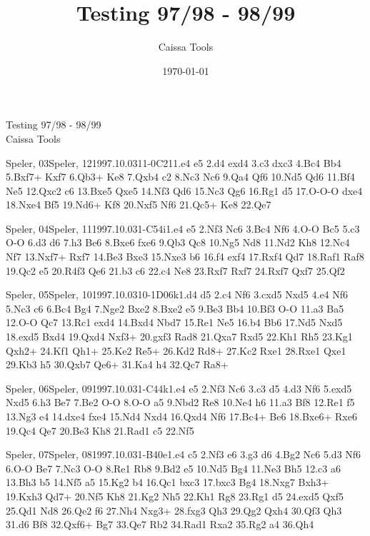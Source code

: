 \documentclass[twocolumn,a4paper,10pt]{report}
\title{Testing 97/98 - 98/99}
\author{Caissa Tools}
\date{\today{}}
\begin{document}
\begin{titlepage}
  \begin{center}
    \huge Testing 97/98 - 98/99 \\
    \vspace{1in}
    \large Caissa Tools \\
  \end{center}
\end{titlepage}

\begin{chessgame}{Speler, 03}{Speler, 12}{1997.10.03}{1}{1-0}{C21}{1.e4 e5 2.d4 exd4 3.c3 dxc3 4.Bc4 Bb4 5.Bxf7+ Kxf7 6.Qb3+ Ke8 7.Qxb4 c2 8.Nc3 Nc6 9.Qa4 Qf6 10.Nd5 Qd6 11.Bf4 Ne5 12.Qxc2 c6 13.Bxe5 Qxe5 14.Nf3 Qd6 15.Nc3 Qg6 16.Rg1 d5 17.O-O-O dxe4 18.Nxe4 Bf5 19.Nd6+ Kf8 20.Nxf5 Nf6 21.Qc5+ Ke8 22.Qe7\mate}\end{chessgame}
\begin{chessgame}{Speler, 04}{Speler, 11}{1997.10.03}{1}{\textonehalf-\textonehalf}{C54i}{1.e4 e5 2.Nf3 Nc6 3.Bc4 Nf6 4.O-O Bc5 5.c3 O-O 6.d3 d6 7.h3 Be6 8.Bxe6 fxe6 9.Qb3 Qc8 10.Ng5 Nd8 11.Nd2 Kh8 12.Nc4 Nf7 13.Nxf7+ Rxf7 14.Be3 Bxe3 15.Nxe3 b6 16.f4 exf4 17.Rxf4 Qd7 18.Raf1 Raf8 19.Qc2 e5 20.R4f3 Qe6 21.b3 c6 22.c4 Ne8 23.Rxf7 Rxf7 24.Rxf7 Qxf7 25.Qf2}\end{chessgame}
\begin{chessgame}{Speler, 05}{Speler, 10}{1997.10.03}{1}{0-1}{D06k}{1.d4 d5 2.c4 Nf6 3.cxd5 Nxd5 4.e4 Nf6 5.Nc3 c6 6.Bc4 Bg4 7.Nge2 Bxe2 8.Bxe2 e5 9.Be3 Bb4 10.Bf3 O-O 11.a3 Ba5 12.O-O Qc7 13.Rc1 exd4 14.Bxd4 Nbd7 15.Re1 Ne5 16.b4 Bb6 17.Nd5 Nxd5 18.exd5 Bxd4 19.Qxd4 Nxf3+ 20.gxf3 Rad8 21.Qxa7 Rxd5 22.Kh1 Rh5 23.Kg1 Qxh2+ 24.Kf1 Qh1+ 25.Ke2 Re5+ 26.Kd2 Rd8+ 27.Kc2 Rxe1 28.Rxe1 Qxe1 29.Kb3 h5 30.Qxb7 Qe6+ 31.Ka4 h4 32.Qc7 Ra8+}\end{chessgame}
\begin{chessgame}{Speler, 06}{Speler, 09}{1997.10.03}{1}{\textonehalf-\textonehalf}{C44k}{1.e4 e5 2.Nf3 Nc6 3.c3 d5 4.d3 Nf6 5.exd5 Nxd5 6.h3 Be7 7.Be2 O-O 8.O-O a5 9.Nbd2 Re8 10.Ne4 h6 11.a3 Bf8 12.Re1 f5 13.Ng3 e4 14.dxe4 fxe4 15.Nd4 Nxd4 16.Qxd4 Nf6 17.Bc4+ Be6 18.Bxe6+ Rxe6 19.Qc4 Qe7 20.Be3 Kh8 21.Rad1 c5 22.Nf5}\end{chessgame}
\begin{chessgame}{Speler, 07}{Speler, 08}{1997.10.03}{1}{\textonehalf-\textonehalf}{B40e}{1.e4 c5 2.Nf3 e6 3.g3 d6 4.Bg2 Nc6 5.d3 Nf6 6.O-O Be7 7.Nc3 O-O 8.Re1 Rb8 9.Bd2 e5 10.Nd5 Bg4 11.Ne3 Bh5 12.c3 a6 13.Bh3 b5 14.Nf5 a5 15.Kg2 b4 16.Qc1 bxc3 17.bxc3 Bg4 18.Nxg7 Bxh3+ 19.Kxh3 Qd7+ 20.Nf5 Kh8 21.Kg2 Nh5 22.Kh1 Rg8 23.Rg1 d5 24.exd5 Qxf5 25.Qd1 Nd8 26.Qe2 f6 27.Nh4 Nxg3+ 28.fxg3 Qh3 29.Qg2 Qxh4 30.Qf3 Qh3 31.d6 Bf8 32.Qxf6+ Bg7 33.Qe7 Rb2 34.Rad1 Rxa2 35.Rg2 a4 36.Qh4}\end{chessgame}
\end{document}
